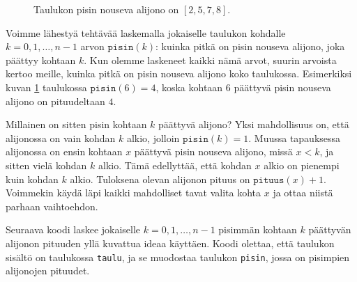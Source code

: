 \begin{figure}
\center
{}
\caption{Taulukon pisin nouseva alijono on $[2,5,7,8]$.}
\label{fig:pisnou}
\end{figure}

Voimme lähestyä tehtävää laskemalla jokaiselle taulukon
kohdalle $k=0,1,\dots,n-1$ arvon $\texttt{pisin}(k)$:
kuinka pitkä on pisin nouseva alijono, joka päättyy kohtaan $k$.
Kun olemme laskeneet kaikki nämä arvot, suurin arvoista kertoo meille,
kuinka pitkä on pisin nouseva alijono koko taulukossa.
Esimerkiksi kuvan \ref{fig:pisnou} taulukossa $\texttt{pisin}(6)=4$,
koska kohtaan $6$ päättyvä pisin nouseva alijono on pituudeltaan $4$.

Millainen on sitten pisin kohtaan $k$ päättyvä alijono?
Yksi mahdollisuus on, että alijonossa on vain kohdan $k$ alkio,
jolloin $\texttt{pisin}(k)=1$.
Muussa tapauksessa alijonossa on ensin kohtaan $x$ päättyvä
pisin nouseva alijono, missä $x<k$, ja sitten vielä kohdan $k$ alkio.
Tämä edellyttää, että kohdan $x$ alkio on pienempi
kuin kohdan $k$ alkio.
Tuloksena olevan alijonon pituus on $\texttt{pituus}(x)+1$.
Voimmekin käydä läpi kaikki mahdolliset tavat valita kohta $x$
ja ottaa niistä parhaan vaihtoehdon.

Seuraava koodi laskee jokaiselle $k=0,1,\dots,n-1$
pisimmän kohtaan $k$ päättyvän alijonon pituuden yllä kuvattua
ideaa käyttäen.
Koodi olettaa, että taulukon sisältö on taulukossa \texttt{taulu},
ja se muodostaa taulukon \texttt{pisin}, jossa on pisimpien
alijonojen pituudet.

